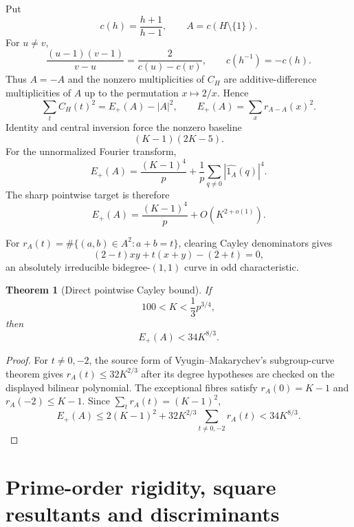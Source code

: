 \documentclass[11pt]{article}
\newtheorem{theorem}{Theorem}[section]
\begin{document}
Put
\[
c(h)=\frac{h+1}{h-1},\qquad A=c(H\setminus\{1\}).
\]
For $u\ne v$,
\begin{equation}\label{eq:cayley}
\frac{(u-1)(v-1)}{v-u}=\frac{2}{c(u)-c(v)},
\qquad c(h^{-1})=-c(h).
\end{equation}
Thus $A=-A$ and the nonzero multiplicities of $C_H$ are additive-difference
multiplicities of $A$ up to the permutation $x\mapsto2/x$.  Hence
\begin{equation}\label{eq:energyCH}
\sum_tC_H(t)^2=E_+(A)-|A|^2,
\qquad
E_+(A)=\sum_xr_{A-A}(x)^2.
\end{equation}
Identity and central inversion force the nonzero baseline
\begin{equation}\label{eq:forced}
(K-1)(2K-5).
\end{equation}
For the unnormalized Fourier transform,
\begin{equation}\label{eq:centered}
E_+(A)=\frac{(K-1)^4}{p}
 +\frac1p\sum_{q\ne0}|\widehat{1_A}(q)|^4.
\end{equation}
The sharp pointwise target is therefore
\begin{equation}\label{eq:sharp-target}
E_+(A)=\frac{(K-1)^4}{p}+O(K^{2+o(1)}).
\end{equation}

For $r_A(t)=\#\{(a,b)\in A^2:a+b=t\}$, clearing Cayley denominators gives
\[
(2-t)xy+t(x+y)-(2+t)=0,
\]
an absolutely irreducible bidegree-$(1,1)$ curve in odd characteristic.

\begin{theorem}[Direct pointwise Cayley bound]\label{thm:direct}
If
\[
100<K<\frac13p^{3/4},
\]
then
\begin{equation}\label{eq:direct}
E_+(A)<34K^{8/3}.
\end{equation}
\end{theorem}

\begin{proof}
For $t\ne0,-2$, the source form of Vyugin--Makarychev's subgroup-curve theorem
\cite{VM2015,MV2019} gives $r_A(t)\le32K^{2/3}$ after its degree hypotheses are
checked on the displayed bilinear polynomial.  The exceptional fibres satisfy
$r_A(0)=K-1$ and $r_A(-2)\le K-1$.  Since
$\sum_tr_A(t)=(K-1)^2$,
\[
E_+(A)
\le2(K-1)^2+32K^{2/3}\sum_{t\ne0,-2}r_A(t)
<34K^{8/3}.
\]
\end{proof}

\section{Prime-order rigidity, square resultants and discriminants}
\end{document}
